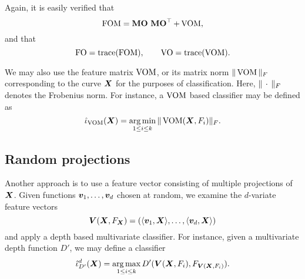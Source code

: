 Again, it is easily verified that
\begin{equation}
    \operatorname{FOM} = \operatorname{\textbf{MO}}\,\operatorname{\textbf{MO}}^\top + \operatorname{VOM},
\end{equation}
and that
\begin{equation}
    \operatorname{FO} = \operatorname{trace}(\operatorname{FOM}), \qquad
    \operatorname{VO} = \operatorname{trace}(\operatorname{VOM}).
\end{equation}

We may also use the feature matrix $\operatorname{VOM}$, or its matrix norm $\Vert \operatorname{VOM} \Vert_F$
corresponding to the curve $\bm{X}$ for the purposes of classification.
Here, $\Vert \,\cdot\, \Vert_F$ denotes the Frobenius norm.
For instance, a $\operatorname{VOM}$ based classifier may be defined as
\begin{equation}
    \hat{\iota}_{\operatorname{VOM}}(\bm{X}) = \operatorname*{arg\,min}_{1 \leq i \leq k} \Vert \operatorname{VOM}(\bm{X}, F_i) \Vert_F.
\end{equation}



\subsection{Random projections}

Another approach is to use a feature vector consisting of multiple projections
of $\bm{X}$.
Given functions $\bm{v}_1, \dots, \bm{v}_d$ chosen at random, we examine the
$d$-variate feature vectors
\begin{equation}
    \bm{V}(\bm{X}, F_{\bm{X}}) = \left(\langle \bm{v}_1, \bm{X} \rangle, \dots, \langle \bm{v}_d, \bm{X} \rangle\right)
\end{equation}
and apply a depth based multivariate classifier.
For instance, given a multivariate depth function $D'$, we may define a
classifier
\begin{equation}
    \hat{\iota}^d_{D'}(\bm{X}) = \operatorname*{arg\,max}_{1 \leq i \leq k} D'(\bm{V}(\bm{X}, F_i), F_{\bm{V}(\bm{X}, F_i)}).
\end{equation}
